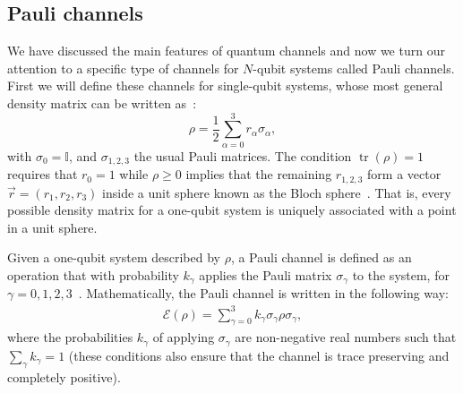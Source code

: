 \documentclass[10pt,letterpaper]{article} %
\DeclareMathOperator{\tr}{tr}
\begin{document}
\subsection{Pauli channels}  \label{subsec: Pauli Channels} %

We have discussed the main features of quantum channels and 
now we turn our attention to a specific 
type of channels for $N$-qubit systems called Pauli channels.
First we will define these channels for single-qubit systems,
whose most general density matrix can be written as~\cite{chuangbook}:
\begin{equation}
\label{eq: Density Matrix}
\rho = \dfrac{1}{2} \sum_{\alpha=0}^{3} r_{\alpha} \sigma_{\alpha},
\end{equation}
with $\sigma_0 = \mathbb{I}$, and $\sigma_{1,2,3}$ the usual Pauli matrices.
The condition $\tr(\rho) = 1$ requires that $r_0 = 1$ while $\rho \geq 0$ 
implies that the remaining $r_{1,2,3}$ form
a vector $\vec{r}= (r_1,r_2,r_3)$ inside a unit sphere known as the Bloch sphere~\cite{Marinescu}.
That is, every possible density matrix for a one-qubit
system is uniquely associated with a point in a unit sphere. 

Given a one-qubit system described by $\rho$, 
a Pauli channel is defined as an operation that with probability $k_{\gamma}$
applies the Pauli matrix $\sigma_{\gamma}$ to
the system, for $\gamma = 0,1,2,3$~\cite{geometry}.
Mathematically, the Pauli channel is written in the following way:
\begin{eqnarray}
\label{eq: Pauli channel 1 qbit}
\mathcal{E}(\rho) = \sum_{\gamma=0}^3 k_{\gamma} \sigma_{\gamma} \rho \sigma_{\gamma},
\end{eqnarray} 
where the probabilities $k_{\gamma}$ of applying $\sigma_{\gamma}$
are non-negative real numbers such that 
$\sum_{\gamma} k_{\gamma} = 1$ (these conditions also ensure that the channel is 
trace preserving and completely positive).
\end{document}
